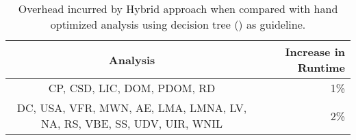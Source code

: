 \begin{table}
	\footnotesize
	\centering
	\caption{Overhead incurred by Hybrid approach when compared with hand optimized analysis using decision tree () as guideline.}
	\setlength{\tabcolsep}{2pt}
	\begin{tabular}{cr}
		\toprule
		Analysis & Increase in Runtime \\
		\midrule
		CP, CSD, LIC, DOM, PDOM, RD & 1\% \\
		DC, USA, VFR, MWN, AE, LMA, LMNA, LV, NA, RS, VBE, SS, UDV, UIR, WNIL  & 2\% \\
		\bottomrule
	\end{tabular}%
	\label{tab:hand-optimize-table}%
\end{table}%